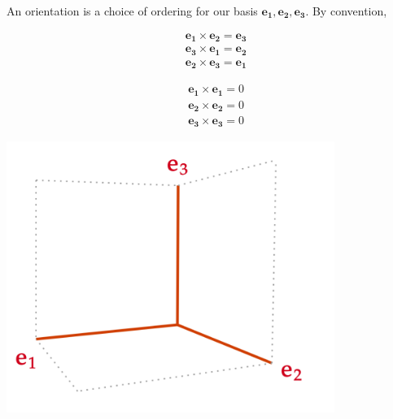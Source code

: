 \begin{marginfigure}
    An orientation is a choice of ordering for our basis $\mathbf{e_1}, \mathbf{e_2}, \mathbf{e_3}$. By convention,
    
    \begin{minipage}{.43\linewidth}
    \begin{align*}
    &\mathbf{e_1} \times \mathbf{e_2}=\mathbf{e_3} \\
    &\mathbf{e_3} \times \mathbf{e_1}=\mathbf{e_2} \\
    &\mathbf{e_2} \times \mathbf{e_3}=\mathbf{e_1}
    \end{align*}
    \end{minipage}
    \begin{minipage}{.43\linewidth}
    \begin{align*}
    &\mathbf{e_1} \times \mathbf{e_1}=0 \\
    &\mathbf{e_2} \times \mathbf{e_2}=0 \\
    &\mathbf{e_3} \times \mathbf{e_3}=0
    \end{align*}
    \end{minipage}
    
    \begin{center}
       \includegraphics[width=0.8\textwidth]{figures/wk-1/fig-2.png}
    \end{center}
\end{marginfigure}

\newpage 

